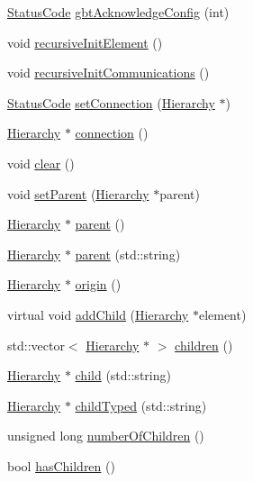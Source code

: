 \begin{DoxyCompactItemize}
\hyperlink{classStatusCode}{StatusCode} \hyperlink{classFEB__v1_af7e7f3cb7269dc811866bc42585cf020}{gbtAcknowledgeConfig} (int)
\item 
void \hyperlink{classElement_a3c0abcb36f8906688bb7e32608df7086}{recursiveInitElement} ()
\item 
void \hyperlink{classElement_a82119ed37dff76508a2746a853ec35ba}{recursiveInitCommunications} ()
\item 
\hyperlink{classStatusCode}{StatusCode} \hyperlink{classElement_ab476b4b1df5954141ceb14f072433b89}{setConnection} (\hyperlink{classHierarchy}{Hierarchy} $\ast$)
\item 
\hyperlink{classHierarchy}{Hierarchy} $\ast$ \hyperlink{classElement_af57444353c1ddf9fa0109801e97debf7}{connection} ()
\item 
void \hyperlink{classHierarchy_af4d43b0765b402670eed2d62c73405af}{clear} ()
\item 
void \hyperlink{classHierarchy_a585ad1aeec16077a0e532ab8b4fc557b}{setParent} (\hyperlink{classHierarchy}{Hierarchy} $\ast$parent)
\item 
\hyperlink{classHierarchy}{Hierarchy} $\ast$ \hyperlink{classHierarchy_a1c7bec8257e717f9c1465e06ebf845fc}{parent} ()
\item 
\hyperlink{classHierarchy}{Hierarchy} $\ast$ \hyperlink{classHierarchy_ad550588733bf75ac5c0fcfd7c8fd11a6}{parent} (std::string)
\item 
\hyperlink{classHierarchy}{Hierarchy} $\ast$ \hyperlink{classHierarchy_aee461dc930ce3871636ff87f075b1b83}{origin} ()
\item 
virtual void \hyperlink{classHierarchy_ad677774ff38fcb257c04a3a10d471fac}{addChild} (\hyperlink{classHierarchy}{Hierarchy} $\ast$element)
\item 
std::vector$<$ \hyperlink{classHierarchy}{Hierarchy} $\ast$ $>$ \hyperlink{classHierarchy_aa9a76f69e98e052ee1a6e32cea006288}{children} ()
\item 
\hyperlink{classHierarchy}{Hierarchy} $\ast$ \hyperlink{classHierarchy_a1e207f973c694b538bf90107b4868817}{child} (std::string)
\item 
\hyperlink{classHierarchy}{Hierarchy} $\ast$ \hyperlink{classHierarchy_a0c15a5276a3b80b4354d6bd8a01e0708}{childTyped} (std::string)
\item 
unsigned long \hyperlink{classHierarchy_ab16e84de65fd84e14001a6cf941c8be4}{numberOfChildren} ()
\item 
bool \hyperlink{classHierarchy_a255174fe4d316d2a3f430dcb9dab29f1}{hasChildren} ()
\item 

\end{DoxyCompactItemize}

